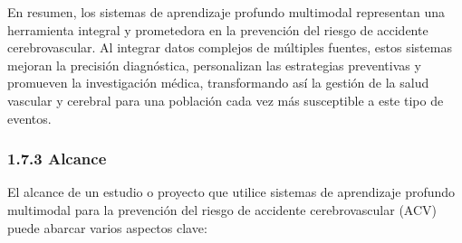 En resumen, los sistemas de aprendizaje profundo multimodal representan una herramienta integral y prometedora en la prevención del riesgo de accidente cerebrovascular. Al integrar datos complejos de múltiples fuentes, estos sistemas mejoran la precisión diagnóstica, personalizan las estrategias preventivas y promueven la investigación médica, transformando así la gestión de la salud vascular y cerebral para una población cada vez más susceptible a este tipo de eventos.
\subsubsection{1.7.3 Alcance}

El alcance de un estudio o proyecto que utilice sistemas de aprendizaje profundo multimodal para la prevención del riesgo de accidente cerebrovascular (ACV) puede abarcar varios aspectos clave:
